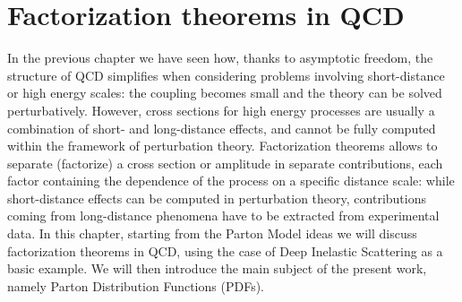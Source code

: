 \chapter{Factorization theorems in QCD}
In the previous chapter we have seen how, thanks to asymptotic freedom, the structure of QCD simplifies when considering problems
involving short-distance or high energy scales: the coupling becomes small and the theory can be solved perturbatively.
However, cross sections for high energy processes are usually a combination of short- and long-distance effects, and cannot
be fully computed within the framework of perturbation theory. Factorization theorems allows to separate (factorize) a cross section
or amplitude in separate contributions, each factor containing the dependence of the process on a specific distance scale:
while short-distance effects can be computed in perturbation theory, contributions coming from long-distance phenomena have
to be extracted from experimental data. 
In this chapter, starting from the Parton Model ideas we will discuss factorization theorems in QCD,
using the case of Deep Inelastic Scattering as a basic example. We will then introduce the main subject of the
present work, namely Parton Distribution Functions (PDFs).

